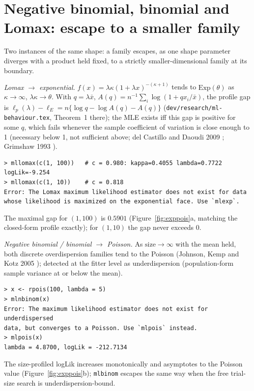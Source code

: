 \documentclass[11pt]{article}
\newcommand{\code}[1]{\texttt{#1}}
\theoremstyle{plain}
\theoremstyle{definition}
\theoremstyle{remark}
\begin{document}
\section{Negative binomial, binomial and Lomax: escape to a smaller family}
\label{sec:exppois}

Two instances of the same shape: a family escapes, as one shape parameter
diverges with a product held fixed, to a strictly smaller-dimensional
family at its boundary.

\emph{Lomax $\to$ exponential.} $f(x)=\lambda\kappa(1+\lambda x)^{-(\kappa+1)}$
tends to $\mathrm{Exp}(\theta)$ as $\kappa\to\infty$, $\lambda\kappa\to\theta$.
With $q=\lambda\bar x$, $A(q)=n^{-1}\sum_i\log(1+qx_i/\bar x)$, the profile
gap is $\ell_p(\lambda)-\ell_E=n\{\log q-\log A(q)-A(q)\}$
(\code{dev/research/ml-behaviour.tex}, Theorem~1 there); the MLE exists iff this
gap is positive for some $q$, which fails whenever the sample coefficient
of variation is close enough to 1 (necessary below 1, not sufficient
above; del Castillo and Daoudi 2009 \cite{delcastillo2009}; Grimshaw 1993
\cite{grimshaw1993}).

\begin{verbatim}
> mllomax(c(1, 100))   # c = 0.980: kappa=0.4055 lambda=0.7722 logLik=-9.254
> mllomax(c(1, 10))    # c = 0.818
Error: The Lomax maximum likelihood estimator does not exist for data
whose likelihood is maximized on the exponential face. Use `mlexp`.
\end{verbatim}
The maximal gap for $(1,100)$ is $0.5901$ (Figure~\ref{fig:exppois}a,
matching the closed-form profile exactly); for $(1,10)$ the gap never
exceeds $0$.

\emph{Negative binomial / binomial $\to$ Poisson.} As
$\mathrm{size}\to\infty$ with the mean held, both discrete overdispersion
families tend to the Poisson (Johnson, Kemp and Kotz 2005
\cite{jkk2005}); detected at the fitter level as underdispersion
(population-form sample variance at or below the mean).

\begin{verbatim}
> x <- rpois(100, lambda = 5)
> mlnbinom(x)
Error: The maximum likelihood estimator does not exist for underdispersed
data, but converges to a Poisson. Use `mlpois` instead.
> mlpois(x)
lambda = 4.8700, logLik = -212.7134
\end{verbatim}
The size-profiled logLik increases monotonically and asymptotes to the
Poisson value (Figure~\ref{fig:exppois}b); \code{mlbinom} escapes the same
way when the free trial-size search is underdispersion-bound.
\end{document}
